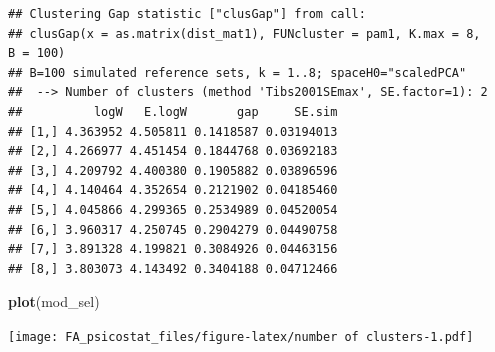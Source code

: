 \documentclass[]{article}
\newenvironment{Shaded}{\begin{snugshade}}{\end{snugshade}}
\newcommand{\CommentTok}[1]{\textcolor[rgb]{0.56,0.35,0.01}{\textit{#1}}}
\newcommand{\ControlFlowTok}[1]{\textcolor[rgb]{0.13,0.29,0.53}{\textbf{#1}}}
\newcommand{\DataTypeTok}[1]{\textcolor[rgb]{0.13,0.29,0.53}{#1}}
\newcommand{\DecValTok}[1]{\textcolor[rgb]{0.00,0.00,0.81}{#1}}
\newcommand{\KeywordTok}[1]{\textcolor[rgb]{0.13,0.29,0.53}{\textbf{#1}}}
\newcommand{\NormalTok}[1]{#1}
\newcommand{\OperatorTok}[1]{\textcolor[rgb]{0.81,0.36,0.00}{\textbf{#1}}}
\newcommand{\OtherTok}[1]{\textcolor[rgb]{0.56,0.35,0.01}{#1}}
\newcommand{\StringTok}[1]{\textcolor[rgb]{0.31,0.60,0.02}{#1}}
\begin{document}
\begin{Shaded}
\end{Shaded}

\begin{verbatim}
## Clustering Gap statistic ["clusGap"] from call:
## clusGap(x = as.matrix(dist_mat1), FUNcluster = pam1, K.max = 8,     B = 100)
## B=100 simulated reference sets, k = 1..8; spaceH0="scaledPCA"
##  --> Number of clusters (method 'Tibs2001SEmax', SE.factor=1): 2
##          logW   E.logW       gap     SE.sim
## [1,] 4.363952 4.505811 0.1418587 0.03194013
## [2,] 4.266977 4.451454 0.1844768 0.03692183
## [3,] 4.209792 4.400380 0.1905882 0.03896596
## [4,] 4.140464 4.352654 0.2121902 0.04185460
## [5,] 4.045866 4.299365 0.2534989 0.04520054
## [6,] 3.960317 4.250745 0.2904279 0.04490758
## [7,] 3.891328 4.199821 0.3084926 0.04463156
## [8,] 3.803073 4.143492 0.3404188 0.04712466
\end{verbatim}

\begin{Shaded}
\begin{Highlighting}[]
\KeywordTok{plot}\NormalTok{(mod_sel)}
\end{Highlighting}
\end{Shaded}

\texttt{[image: FA\_psicostat\_files/figure-latex/number of clusters-1.pdf]}
\end{document}
